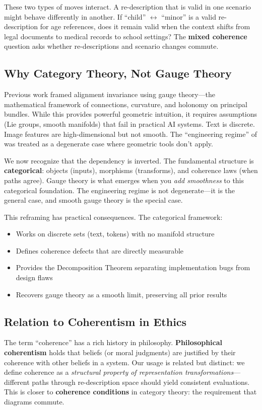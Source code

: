 \documentclass[12pt]{article}
\begin{document}
These two types of moves interact. A re-description that is valid in one scenario might behave differently in another. If ``child'' $\leftrightarrow$ ``minor'' is a valid re-description for age references, does it remain valid when the context shifts from legal documents to medical records to school settings? The \textbf{mixed coherence} question asks whether re-descriptions and scenario changes commute.

\subsection{Why Category Theory, Not Gauge Theory}

Previous work framed alignment invariance using gauge theory---the mathematical framework of connections, curvature, and holonomy on principal bundles. While this provides powerful geometric intuition, it requires assumptions (Lie groups, smooth manifolds) that fail in practical AI systems. Text is discrete. Image features are high-dimensional but not smooth. The ``engineering regime'' of was treated as a degenerate case where geometric tools don't apply.

We now recognize that the dependency is inverted. The fundamental structure is \textbf{categorical}: objects (inputs), morphisms (transforms), and coherence laws (when paths agree). Gauge theory is what emerges when you \emph{add smoothness} to this categorical foundation. The engineering regime is not degenerate---it is the general case, and smooth gauge theory is the special case.

This reframing has practical consequences. The categorical framework:
\begin{itemize}
    \item Works on discrete sets (text, tokens) with no manifold structure
    \item Defines coherence defects that are directly measurable
    \item Provides the Decomposition Theorem separating implementation bugs from design flaws
    \item Recovers gauge theory as a smooth limit, preserving all prior results
\end{itemize}

\subsection{Relation to Coherentism in Ethics}

The term ``coherence'' has a rich history in philosophy. \textbf{Philosophical coherentism} holds that beliefs (or moral judgments) are justified by their coherence with other beliefs in a system. Our usage is related but distinct: we define coherence as a \emph{structural property of representation transformations}---different paths through re-description space should yield consistent evaluations. This is closer to \textbf{coherence conditions} in category theory: the requirement that diagrams commute.
\end{document}
